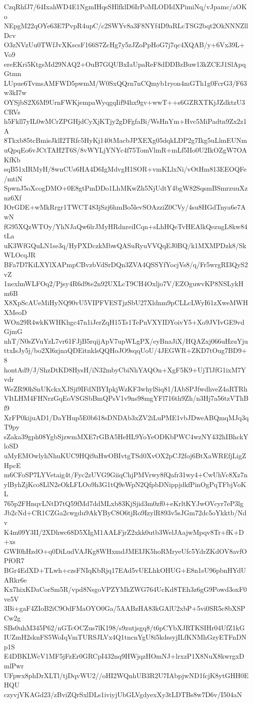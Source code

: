 CzqRhfJ7/64IxahWD4E1NgmIHqsSHlfklD6IrPoMLODIdXPimiNq/vJpamc/aOKo
NEpgM22qOYe63E7PvpR4upC/c2SWYv8a3F8NYf4D9aRLcTSG2bqt2OkNNNZllDcv
O3zNVzUu0TWfJvXKscsF166S7ZcHg7y5zJZoPpHoG7j7qc4XQAB/y+6Vx39L+Vo9
ereEKri5KtgsMd29NAQ2+OuB7GQUBxIaUpaReF8dDDBzBuw13kZCEJ1SlApqGtmn
LUpue6TvmsAMFWD5pwmM/W0SxQQrn7nCQmyb1ryon4mGTh1g0FcrG3/F63w3kI7w
OYSjbS2X6M9UrnFWKjempaWyqgqIif94hx9gv+wwT++s6GZRXTKjJZdktzU3CRVs
h5Fkll7yIL0wMCrZPGHjdCyXjKTjy2gDFgfaBi/WsHnYm+Hvc5MiPadtn9Zx2z1A
8Tkxb85tcBmisJklI2TRfc5HyKj140tMacbJPXEXg05dqkLDP2g7Ikg5uLlmEUNm
uQpqEo6vJCtTAH2T6S/8vWYLjYNYc4f75TomVlmR+mLf5IIo0U2IkOZgW7OAKfKb
sqB51xIRMyH/8wnCUs6HA4D6IgMdvgH1SOR+vmKLlxNi/vOtHm813EEOQFe/mtiN
SpwnJ5oXcogDMO+0E8gtPmDDo1LhMKwZh5NjUdtY4bgW82SqsmBSmrzuuXznz6Xf
IOrGDE+wMkRrgr1TWCT483jSzj6hmBo5levSOAzziZ0CVy/4su8HGdTnya6e7AwN
fG95XQzWTOy/YhNJaQw6lrJMyHRdnreiICqn+sLhHQeTvHEAlkQezugL8kw84tLa
uK3WfGQuLN1se3q/HyPXDczkMbwQASuRyuVVQqEJ0BQ/k1MXMPDzk8/SkWLOcqJR
BFa7D7KiLXYlXAPmpCBvzbVdSrDQn3ZVA4QSSYfYocjVs8/q/Fr5wrgRI3QyS2vZ
1nexlmWLFOq2/Pjsy4R6d9te2n92UXLcT9CH4Oxljo7V/EZOguwvKP8NSLykHm6B
X8XpScAUeMiHyNQ90vU5VIPFVESTjzSbU27Xldnm9pCLLcLWyI61zXweMWHXMeoD
WOn29R4wkKWHKhgc47n1iJerZqH15Ts1TePnVXYIDYoivY5+Xo9JVIvGE9vdGjmG
nhT/N0sZVuYzL7vr61FJjB5rqijApV7upWLgPX/eyBnaJiX/HQAZxj066uHzuYju
ttxIsJy5j/bo2Xl6zjnaQDEitnklsQQHoJO9sqqUoU/4JEGWR+ZKD7tOug7BD9+8
hontAd9/J/ShzDtKD8HysH/iN32mbyCbiNhYAQOn+XgF5K9+UjTlJfG1ixM7Yvdr
WeZR90hSnUKckxXJSji9IFdNBYIpkjWzKF3whylSiq81/IAbSPJfwdhveZ4aRTRh
VItLHM4FHNrzGqEoVSGSbBmQPsV1v9ns98mgYFl716th9Zh/n3Hj7a56tzVThBf9
XrFP0kijuAD1/DaYHup5E0b618sDNDAb3xZV2iLuPME1vbJDweABQmqMJq3qT9py
sZaka39gph08YgbSjzwmMXE7rGBA5HeHL9YoYeODKbPWC4wzNY432hIBhckYloSD
uMyEMOwlyhNhuKUC9HQi9aHwOBIvtgTSd0XvOX2pCJ2foj6BtXaWREfjLigZHpcE
m6CFoSP7LYVetaig4t/Fyc2zUVG9GiiqChjPMVrwy8fQafr31wy4+CwUhVc8Xz7n
ylByhZjKco8LlN2eOkLFLOo9h3G1tQ9eWpN2QfpbDNippjdkfPinOgPqTFbjVoKL
765p2FHnqvLNtD7tQ59fMd7ddMLxb83KjSjid3m0zf0+eKrltKYJwOVcyr7eP3lg
Jb2cNd+CR1CZGa2cwgdu9AkYByC8O6tjRo9IzylR893v5sJGm72dc5oYkktb/Ndv
K4m09Y3II/2XDhwc68D5XIgM1AALFjrZ2xkk0utb3WelJAajwMpqv8Tr+fK+D+xs
GWI0hHzdO+q0DiLudVAJKg8WHxmdJMEIJK5hoRMryeUfc5YdrZKdOV8avfOPfOR7
BGr4EdXD+TLwh+czsFNIqKbRjq17EAd5vUELhkOHUG+E8n1sU96pbnHYdUARkr6e
Kx7hixKDaCorSm5R/vpd8NsgoVPZYMkZWG764UcKd8TEh3z6gG9Powd3oxF0ve5V
3Bi+gaF4ZIoB2iC9OdFMaOYO0Ga/5AABzHA83kGAlU2xbP+5vi0SR5c8bXSPCw2g
SBs0uhM345P62/nGTcOCZus7lK198/s9zutjsgq8/t6pCYbXJRTKSIHr04UfZ1kG
IUZmH2sknFS5WoIqVmTURSJLVx4Q1tncnYgU8i5kdssyjILfKNMhGzyETFnDNp1S
E4DBKLWcV1MF5jFzEr0GRCpI432nq9HWjqzHOmNJ+lrxzP1X8NuX8kwrgxDmlPwr
UFpwx8phDrXLTl/tjDqvWU2//oHI2WQnhUB3R2U7IAbpjwND1fcjK8ytGHH0EHQU
czyvjVKAGd23/zBviZQrSxlDLs1iviyjUbGLVgdyexXy3tLDTBs8w7D6v/I504aN
